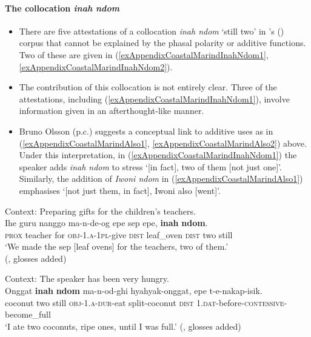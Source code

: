 \paragraph{The collocation \textit{ inah ndom}}
\begin{itemize}
	\item There are five attestations of a collocation \textit{inah ndom} \lq still two' in \citeauthor{Olsson2015}'s (\citeyear{Olsson2015}) corpus that cannot be explained by the phasal polarity or additive functions. Two of these are given in (\ref{exAppendixCoastalMarindInahNdom1}, \ref{exAppendixCoastalMarindInahNdom2}).
	\item The contribution of this collocation is not entirely clear. Three of the attestations, including (\ref{exAppendixCoastalMarindInahNdom1}), involve information given in an afterthought-like manner.
	\item Bruno Olsson (p.c.) suggests a conceptual link to additive uses as in (\ref{exAppendixCoastalMarindAlso1}, \ref{exAppendixCoastalMarindAlso2}) above. Under this interpretation, in (\ref{exAppendixCoastalMarindInahNdom1}) the speaker adds \textit{inah ndom} to stress \lq [in fact], two of them [not just one]'. Similarly, the addition of \textit{Iwoni ndom} in (\ref{exAppendixCoastalMarindAlso1}) emphasises \lq [not just them, in fact], Iwoni also [went]'.
\end{itemize}

\begin{exe}
	\ex \label{exAppendixCoastalMarindInahNdom1}
	Context: Preparing gifts for the children's teachers.\\
	\gll Ihe guru nanggo ma-n-de-og epe sep epe, \textbf{inah} \textbf{ndom}.\\
	\textsc{prox} teacher for \textsc{obj}-1.\textsc{a}-1\textsc{pl}-give \textsc{dist} leaf\_oven \textsc{dist} two still\\
	\glt \lq We made the sep [leaf ovens] for the teachers, two of them.' 	\\(\cite{Olsson2015}, glosses added)

	\ex \label{exAppendixCoastalMarindInahNdom2}
	Context: The speaker has been very hungry.\\
	\gll Onggat \textbf{inah} \textbf{ndom} ma-n-od-ghi hyahyak-onggat, epe t-e-nakap-isik.\\
	coconut two still \textsc{obj}-1.\textsc{a}-\textsc{dur}-eat split-coconut  \textsc{dist} 1.\textsc{dat}-before-\textsc{contessive}-become\_full \\
		\glt \lq I ate two coconuts, ripe ones, until I was full.\rq{ }(\cite{Olsson2015}, glosses added)\\
\end{exe}

